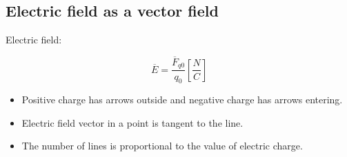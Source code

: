 \documentclass[letterpaper]{article}
\newcommand{\divline}{\noindent\makebox[\linewidth]{\rule{\textwidth}{0.4pt}}}
\begin{document}
    \divline
    \begin{multicols}{2}
        \section{Electric field as a vector field}
        
        Electric field:

        \[\overline{E} = \frac{\overline{F}_{q0}}{q_{0}} \left[ \frac{N}{C} \right] \]

        \begin{itemize}
            \item Positive charge has arrows outside and negative charge has arrows entering.
            \item Electric field vector in a point is tangent to the line.
            \item The number of lines is proportional to the value of electric charge.
        \end{itemize}
    \end{multicols}
\end{document}
